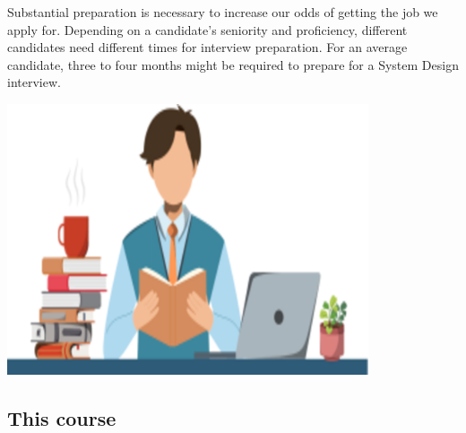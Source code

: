 

\noindent
\begin{minipage}[t]{0.48\textwidth}
Substantial preparation is necessary to increase our odds of getting the job we apply for. Depending on a candidate's seniority and proficiency, different candidates need different times for interview preparation. For an average candidate, three to four months might be required to prepare for a System Design interview.
\end{minipage}
\hfill
\begin{minipage}[t]{0.48\textwidth}
\includegraphics[width=0.8\textwidth]{Images/chapter_1/section_5546916426809344/5699614642929664.png}
\end{minipage}

\noindent
\begin{minipage}[t]{0.48\textwidth}

\end{minipage}
\hfill
\begin{minipage}[t]{0.48\textwidth}

\end{minipage}

\subsection{This course}\label{7xxiaspEOx6hDBiwP4TQV}

